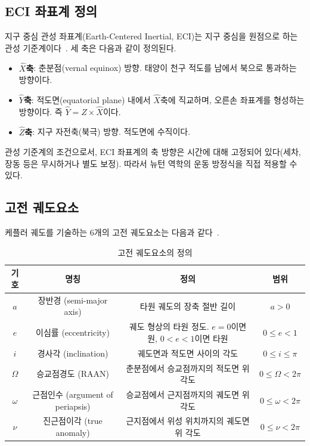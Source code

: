 \documentclass[11pt]{article}
\begin{document}
\subsection{ECI 좌표계 정의}

지구 중심 관성 좌표계(Earth-Centered Inertial, ECI)는 지구 중심을 원점으로 하는 관성 기준계이다~\cite{Vallado2013}. 세 축은 다음과 같이 정의된다.

\begin{itemize}
  \item \textbf{$\hat{X}$축}: 춘분점(vernal equinox) 방향. 태양이 천구 적도를 남에서 북으로 통과하는 방향이다.
  \item \textbf{$\hat{Y}$축}: 적도면(equatorial plane) 내에서 $\hat{X}$축에 직교하며, 오른손 좌표계를 형성하는 방향이다. 즉 $\hat{Y} = \hat{Z} \times \hat{X}$이다.
  \item \textbf{$\hat{Z}$축}: 지구 자전축(북극) 방향. 적도면에 수직이다.
\end{itemize}

관성 기준계의 조건으로서, ECI 좌표계의 축 방향은 시간에 대해 고정되어 있다(세차, 장동 등은 무시하거나 별도 보정). 따라서 뉴턴 역학의 운동 방정식을 직접 적용할 수 있다.

\subsection{고전 궤도요소}

케플러 궤도를 기술하는 6개의 고전 궤도요소는 다음과 같다~\cite{Vallado2013, Curtis2020}.

\begin{table}[h]
\centering
\begin{tabular}{cccc}
\toprule
기호 & 명칭 & 정의 & 범위 \\
\midrule
$a$ & 장반경 (semi-major axis) & 타원 궤도의 장축 절반 길이 & $a > 0$ \\
$e$ & 이심률 (eccentricity) & 궤도 형상의 타원 정도. $e=0$이면 원, $0<e<1$이면 타원 & $0 \le e < 1$ \\
$i$ & 경사각 (inclination) & 궤도면과 적도면 사이의 각도 & $0 \le i \le \pi$ \\
$\Omega$ & 승교점경도 (RAAN) & 춘분점에서 승교점까지의 적도면 위 각도 & $0 \le \Omega < 2\pi$ \\
$\omega$ & 근점인수 (argument of periapsis) & 승교점에서 근지점까지의 궤도면 위 각도 & $0 \le \omega < 2\pi$ \\
$\nu$ & 진근점이각 (true anomaly) & 근지점에서 위성 위치까지의 궤도면 위 각도 & $0 \le \nu < 2\pi$ \\
\bottomrule
\end{tabular}
\caption{고전 궤도요소의 정의}
\label{tab:oe_definition}
\end{table}
\end{document}

